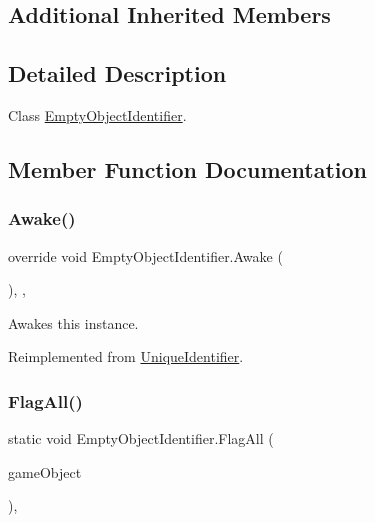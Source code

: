 \subsection*{Additional Inherited Members}


\subsection{Detailed Description}
Class \hyperlink{class_empty_object_identifier}{Empty\+Object\+Identifier}. 



\subsection{Member Function Documentation}
\mbox{\label{class_empty_object_identifier_abb11a8f33d5c145640db3e69b6d34f10}} 
\subsubsection{\texorpdfstring{Awake()}{Awake()}}
{\footnotesize\ttfamily override void Empty\+Object\+Identifier.\+Awake (\begin{DoxyParamCaption}{ }\end{DoxyParamCaption})\hspace{0.3cm}{\ttfamily [inline]}, {\ttfamily [protected]}, {\ttfamily [virtual]}}



Awakes this instance. 



Reimplemented from \hyperlink{class_unique_identifier_adc29ef30266f6ac51f9489ce21d0f816}{Unique\+Identifier}.

\mbox{\label{class_empty_object_identifier_ad2d9725d5326b826351ed11c539934d5}} 
\subsubsection{\texorpdfstring{Flag\+All()}{FlagAll()}}
{\footnotesize\ttfamily static void Empty\+Object\+Identifier.\+Flag\+All (\begin{DoxyParamCaption}\item[{Game\+Object}]{game\+Object }\end{DoxyParamCaption})\hspace{0.3cm}{\ttfamily [inline]}, {\ttfamily [static]}}



